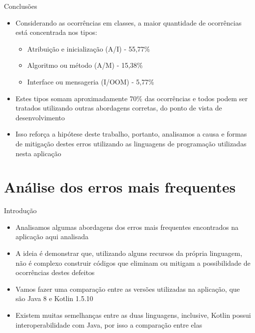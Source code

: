\documentclass[brazilian]{beamer}
\begin{document}
\begin{frame}{Conclusões}
    \begin{itemize}
        \item Considerando as ocorrências em classes, a maior quantidade de ocorrências está concentrada nos tipos:
            \begin{itemize}
                \item Atribuição e inicialização (A/I) - 55,77\%
                \item Algoritmo ou método (A/M) - 15,38\%
                \item Interface ou mensageria (I/OOM) - 5,77\%
            \end{itemize}
        \item Estes tipos somam aproximadamente 70\% das ocorrências e todos podem ser tratados utilizando outras abordagens corretas, do ponto de vista de desenvolvimento
        \item Isso reforça a hipótese deste trabalho, portanto, analisamos a causa e formas de mitigação destes erros utilizando as linguagens de programação utilizadas nesta aplicação
    \end{itemize}
\end{frame}

\section{Análise dos erros mais frequentes}

\begin{frame}{Introdução}
    \begin{itemize}
        \item Analisamos algumas abordagens dos erros mais frequentes encontrados na aplicação aqui analisada
        \item A ideia é demonstrar que, utilizando alguns recursos da própria linguagem, não é complexo construir códigos que eliminam ou mitigam a possibilidade de ocorrências destes defeitos
        \item Vamos fazer uma comparação entre as versões utilizadas na aplicação, que são Java 8 e Kotlin 1.5.10
        \item Existem muitas semelhanças entre as duas linguagens, inclusive, Kotlin possui interoperabilidade com Java, por isso a comparação entre elas
    \end{itemize}
\end{frame}
\end{document}
